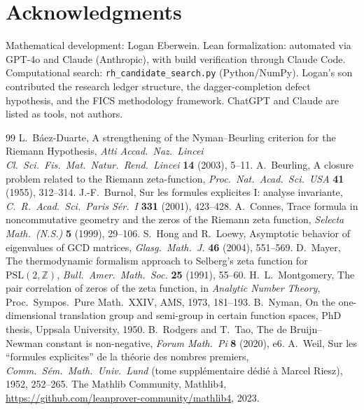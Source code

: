 \documentclass[11pt]{article}
\theoremstyle{remark}
\begin{document}
\section*{Acknowledgments}

Mathematical development: Logan Eberwein.
Lean formalization: automated via GPT-4o and Claude (Anthropic), with build verification through Claude Code.
Computational search: \texttt{rh\_candidate\_search.py} (Python/NumPy).
Logan's son contributed the research ledger structure, the dagger-completion defect hypothesis,
and the FICS methodology framework.
ChatGPT and Claude are listed as tools, not authors.

\begin{thebibliography}{99}
 L.~Báez-Duarte, A strengthening of the Nyman--Beurling criterion for the Riemann Hypothesis, \textit{Atti Accad.\ Naz.\ Lincei Cl.\ Sci.\ Fis.\ Mat.\ Natur.\ Rend.\ Lincei} \textbf{14} (2003), 5--11.
 A.~Beurling, A closure problem related to the Riemann zeta-function, \textit{Proc.\ Nat.\ Acad.\ Sci.\ USA} \textbf{41} (1955), 312--314.
 J.-F.~Burnol, Sur les formules explicites I: analyse invariante, \textit{C.~R.~Acad.\ Sci.\ Paris S\'{e}r.~I} \textbf{331} (2001), 423--428.
 A.~Connes, Trace formula in noncommutative geometry and the zeros of the Riemann zeta function, \textit{Selecta Math.\ (N.S.)} \textbf{5} (1999), 29--106.
 S.~Hong and R.~Loewy, Asymptotic behavior of eigenvalues of GCD matrices, \textit{Glasg.\ Math.\ J.} \textbf{46} (2004), 551--569.
 D.~Mayer, The thermodynamic formalism approach to Selberg's zeta function for $\mathrm{PSL}(2,\mathbb{Z})$, \textit{Bull.\ Amer.\ Math.\ Soc.} \textbf{25} (1991), 55--60.
 H.~L.~Montgomery, The pair correlation of zeros of the zeta function, in \textit{Analytic Number Theory}, Proc.\ Sympos.\ Pure Math.\ XXIV, AMS, 1973, 181--193.
 B.~Nyman, On the one-dimensional translation group and semi-group in certain function spaces, PhD thesis, Uppsala University, 1950.
 B.~Rodgers and T.~Tao, The de Bruijn--Newman constant is non-negative, \textit{Forum Math.\ Pi} \textbf{8} (2020), e6.
 A.~Weil, Sur les ``formules explicites'' de la th\'{e}orie des nombres premiers, \textit{Comm.\ S\'{e}m.\ Math.\ Univ.\ Lund} (tome suppl\'{e}mentaire d\'{e}di\'{e} \`{a} Marcel Riesz), 1952, 252--265.
 The Mathlib Community, Mathlib4, \url{https://github.com/leanprover-community/mathlib4}, 2023.
\end{thebibliography}
\end{document}
